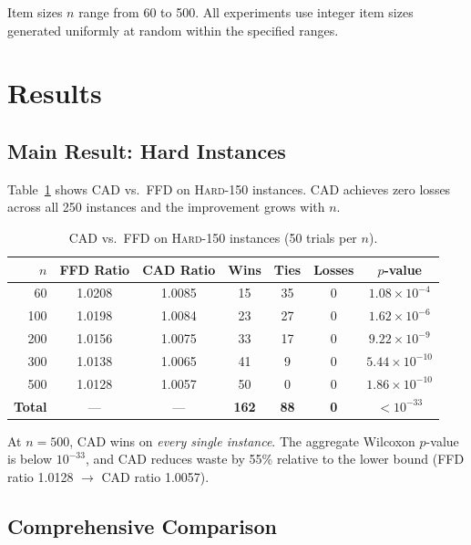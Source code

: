 \documentclass[11pt]{article}
\begin{document}
Item sizes $n$ range from 60 to 500. All experiments use integer item sizes generated
uniformly at random within the specified ranges.

\section{Results}

\subsection{Main Result: Hard Instances}

Table~\ref{tab:hard150} shows CAD vs.\ FFD on \textsc{Hard-150} instances.
CAD achieves zero losses across all 250 instances and the improvement grows with $n$.

\begin{table}[h]
\centering
\caption{CAD vs.\ FFD on \textsc{Hard-150} instances (50 trials per $n$).}
\label{tab:hard150}
\begin{tabular}{rcccccc}
\toprule
$n$ & FFD Ratio & CAD Ratio & Wins & Ties & Losses & $p$-value \\
\midrule
60  & 1.0208 & 1.0085 & 15 & 35 & 0 & $1.08 \times 10^{-4}$ \\
100 & 1.0198 & 1.0084 & 23 & 27 & 0 & $1.62 \times 10^{-6}$ \\
200 & 1.0156 & 1.0075 & 33 & 17 & 0 & $9.22 \times 10^{-9}$ \\
300 & 1.0138 & 1.0065 & 41 &  9 & 0 & $5.44 \times 10^{-10}$ \\
500 & 1.0128 & 1.0057 & 50 &  0 & 0 & $1.86 \times 10^{-10}$ \\
\midrule
\textbf{Total} & --- & --- & \textbf{162} & \textbf{88} & \textbf{0} & $< 10^{-33}$ \\
\bottomrule
\end{tabular}
\end{table}

At $n = 500$, CAD wins on \emph{every single instance}. The aggregate Wilcoxon $p$-value
is below $10^{-33}$, and CAD reduces waste by 55\% relative to the lower bound
(FFD ratio 1.0128 $\to$ CAD ratio 1.0057).

\subsection{Comprehensive Comparison}
\end{document}
